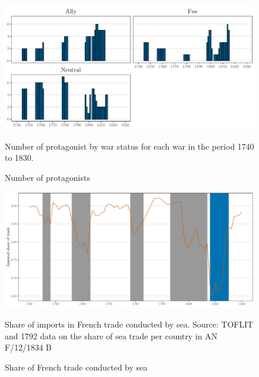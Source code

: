 \documentclass[12pt,a4paper,notitlepage,english]{article}
\newcommand{\fontsmall}{\fontsize{10pt}{12pt}\selectfont}
\begin{document}
\begin{appendix}
\begin{center}
\begin{figure}[h!]
\caption{Number of protagonists}
\label{fig:number_of_protagonist}
\centering
\includegraphics[scale=.18]{Number_of_protagonist}
\begin{minipage}{.9\textwidth}
\begin{flushleft}
\fontsmall
Number of protagonist by war status for each war in the period 1740 to 1830.
\end{flushleft}
\end{minipage}
\end{figure}
\end{center}



\begin{figure}[h!]
\caption{Share of French trade conducted by sea}\label{share_by_sea}
\centering
\includegraphics[scale=.19]{share_by_sea}
\begin{minipage}{18cm}
\begin{flushleft}
\fontsmall
Share of imports in French trade conducted by sea. 
Source: TOFLIT and 1792 data on the share of sea trade per country in AN F/12/1834 B
\end{flushleft}
\end{minipage}
\end{figure}



\end{appendix}
\end{document}
